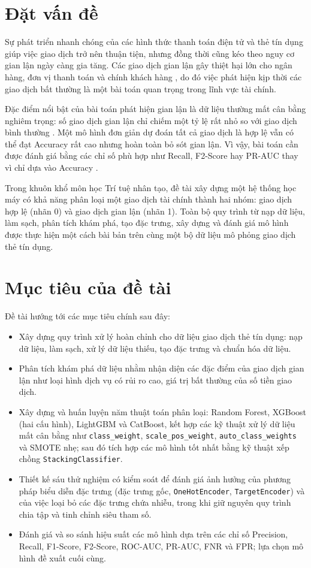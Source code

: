 \section{Đặt vấn đề}
Sự phát triển nhanh chóng của các hình thức thanh toán điện tử và thẻ tín dụng giúp việc giao dịch trở nên thuận tiện, nhưng đồng thời cũng kéo theo nguy cơ gian lận ngày càng gia tăng. Các giao dịch gian lận gây thiệt hại lớn cho ngân hàng, đơn vị thanh toán và chính khách hàng \cite{bhattacharyya2011creditcard}, do đó việc phát hiện kịp thời các giao dịch bất thường là một bài toán quan trọng trong lĩnh vực tài chính.

Đặc điểm nổi bật của bài toán phát hiện gian lận là dữ liệu thường mất cân bằng nghiêm trọng: số giao dịch gian lận chỉ chiếm một tỷ lệ rất nhỏ so với giao dịch bình thường \cite{he2009imbalanced, dalpozzolo2015credit}. Một mô hình đơn giản dự đoán tất cả giao dịch là hợp lệ vẫn có thể đạt Accuracy rất cao nhưng hoàn toàn bỏ sót gian lận. Vì vậy, bài toán cần được đánh giá bằng các chỉ số phù hợp như Recall, F2-Score hay PR-AUC thay vì chỉ dựa vào Accuracy \cite{davis2006pr}.

Trong khuôn khổ môn học Trí tuệ nhân tạo, đề tài xây dựng một hệ thống học máy có khả năng phân loại một giao dịch tài chính thành hai nhóm: giao dịch hợp lệ (nhãn 0) và giao dịch gian lận (nhãn 1). Toàn bộ quy trình từ nạp dữ liệu, làm sạch, phân tích khám phá, tạo đặc trưng, xây dựng và đánh giá mô hình được thực hiện một cách bài bản trên cùng một bộ dữ liệu mô phỏng giao dịch thẻ tín dụng.

\section{Mục tiêu của đề tài}
Đề tài hướng tới các mục tiêu chính sau đây:
\begin{itemize}
    \item Xây dựng quy trình xử lý hoàn chỉnh cho dữ liệu giao dịch thẻ tín dụng: nạp dữ liệu, làm sạch, xử lý dữ liệu thiếu, tạo đặc trưng và chuẩn hóa dữ liệu.
    \item Phân tích khám phá dữ liệu nhằm nhận diện các đặc điểm của giao dịch gian lận như loại hình dịch vụ có rủi ro cao, giá trị bất thường của số tiền giao dịch.
    \item Xây dựng và huấn luyện năm thuật toán phân loại: Random Forest, XGBoost (hai cấu hình), LightGBM và CatBoost, kết hợp các kỹ thuật xử lý dữ liệu mất cân bằng như \texttt{class\_weight}, \texttt{scale\_pos\_weight}, \texttt{auto\_class\_weights} và SMOTE nhẹ; sau đó tích hợp các mô hình tốt nhất bằng kỹ thuật xếp chồng \texttt{StackingClassifier}.
    \item Thiết kế sáu thử nghiệm có kiểm soát để đánh giá ảnh hưởng của phương pháp biểu diễn đặc trưng (đặc trưng gốc, \texttt{OneHotEncoder}, \texttt{TargetEncoder}) và của việc loại bỏ các đặc trưng chứa nhiễu, trong khi giữ nguyên quy trình chia tập và tinh chỉnh siêu tham số.
    \item Đánh giá và so sánh hiệu suất các mô hình dựa trên các chỉ số Precision, Recall, F1-Score, F2-Score, ROC-AUC, PR-AUC, FNR và FPR; lựa chọn mô hình đề xuất cuối cùng.
\end{itemize}

